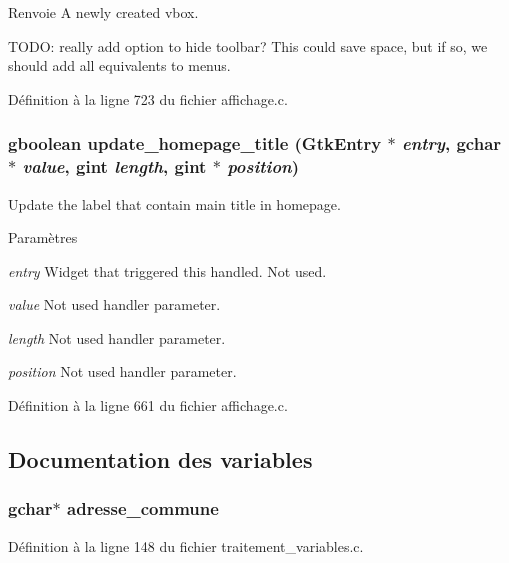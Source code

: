 \begin{DoxyReturn}{Renvoie}
A newly created vbox. 
\end{DoxyReturn}


TODO: really add option to hide toolbar? This could save space, but if so, we should add all equivalents to menus. 



Définition à la ligne 723 du fichier affichage.c.

\subsubsection[{update\_\-homepage\_\-title}]{\setlength{\rightskip}{0pt plus 5cm}gboolean update\_\-homepage\_\-title (GtkEntry $\ast$ {\em entry}, \/  gchar $\ast$ {\em value}, \/  gint {\em length}, \/  gint $\ast$ {\em position})}\label{affichage_8c_a540ad020b9ea9514f836a69f20e412cd}
Update the label that contain main title in homepage.


\begin{DoxyParams}{Paramètres}
\item[{\em entry}]Widget that triggered this handled. Not used. \item[{\em value}]Not used handler parameter. \item[{\em length}]Not used handler parameter. \item[{\em position}]Not used handler parameter. \end{DoxyParams}


Définition à la ligne 661 du fichier affichage.c.



\subsection{Documentation des variables}
\subsubsection[{adresse\_\-commune}]{\setlength{\rightskip}{0pt plus 5cm}gchar$\ast$ {\bf adresse\_\-commune}}\label{affichage_8c_ab7ec5b8a1b4dca10b71bfe0364eb7248}


Définition à la ligne 148 du fichier traitement\_\-variables.c.

